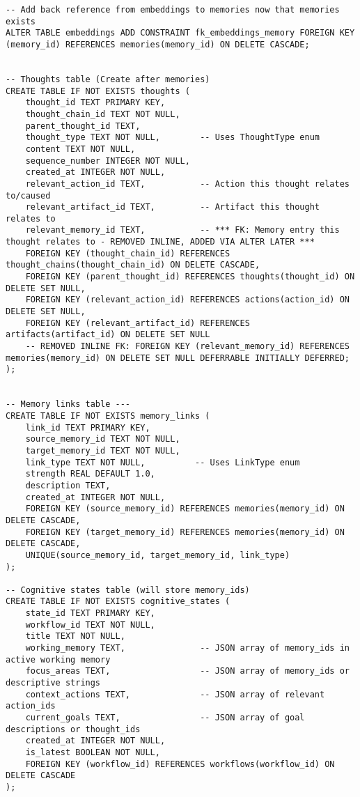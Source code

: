 \documentclass[12pt,a4paper]{article}
\begin{document}
\begin{pageablecode}
\begin{verbatim}
-- Add back reference from embeddings to memories now that memories exists
ALTER TABLE embeddings ADD CONSTRAINT fk_embeddings_memory FOREIGN KEY (memory_id) REFERENCES memories(memory_id) ON DELETE CASCADE;


-- Thoughts table (Create after memories)
CREATE TABLE IF NOT EXISTS thoughts (
    thought_id TEXT PRIMARY KEY,
    thought_chain_id TEXT NOT NULL,
    parent_thought_id TEXT,
    thought_type TEXT NOT NULL,        -- Uses ThoughtType enum
    content TEXT NOT NULL,
    sequence_number INTEGER NOT NULL,
    created_at INTEGER NOT NULL,
    relevant_action_id TEXT,           -- Action this thought relates to/caused
    relevant_artifact_id TEXT,         -- Artifact this thought relates to
    relevant_memory_id TEXT,           -- *** FK: Memory entry this thought relates to - REMOVED INLINE, ADDED VIA ALTER LATER ***
    FOREIGN KEY (thought_chain_id) REFERENCES thought_chains(thought_chain_id) ON DELETE CASCADE,
    FOREIGN KEY (parent_thought_id) REFERENCES thoughts(thought_id) ON DELETE SET NULL,
    FOREIGN KEY (relevant_action_id) REFERENCES actions(action_id) ON DELETE SET NULL,
    FOREIGN KEY (relevant_artifact_id) REFERENCES artifacts(artifact_id) ON DELETE SET NULL
    -- REMOVED INLINE FK: FOREIGN KEY (relevant_memory_id) REFERENCES memories(memory_id) ON DELETE SET NULL DEFERRABLE INITIALLY DEFERRED;
);


-- Memory links table ---
CREATE TABLE IF NOT EXISTS memory_links (
    link_id TEXT PRIMARY KEY,
    source_memory_id TEXT NOT NULL,
    target_memory_id TEXT NOT NULL,
    link_type TEXT NOT NULL,          -- Uses LinkType enum
    strength REAL DEFAULT 1.0,
    description TEXT,
    created_at INTEGER NOT NULL,
    FOREIGN KEY (source_memory_id) REFERENCES memories(memory_id) ON DELETE CASCADE,
    FOREIGN KEY (target_memory_id) REFERENCES memories(memory_id) ON DELETE CASCADE,
    UNIQUE(source_memory_id, target_memory_id, link_type)
);

-- Cognitive states table (will store memory_ids)
CREATE TABLE IF NOT EXISTS cognitive_states (
    state_id TEXT PRIMARY KEY,
    workflow_id TEXT NOT NULL,
    title TEXT NOT NULL,
    working_memory TEXT,               -- JSON array of memory_ids in active working memory
    focus_areas TEXT,                  -- JSON array of memory_ids or descriptive strings
    context_actions TEXT,              -- JSON array of relevant action_ids
    current_goals TEXT,                -- JSON array of goal descriptions or thought_ids
    created_at INTEGER NOT NULL,
    is_latest BOOLEAN NOT NULL,
    FOREIGN KEY (workflow_id) REFERENCES workflows(workflow_id) ON DELETE CASCADE
);


\end{verbatim}
\end{pageablecode}
\end{document}
